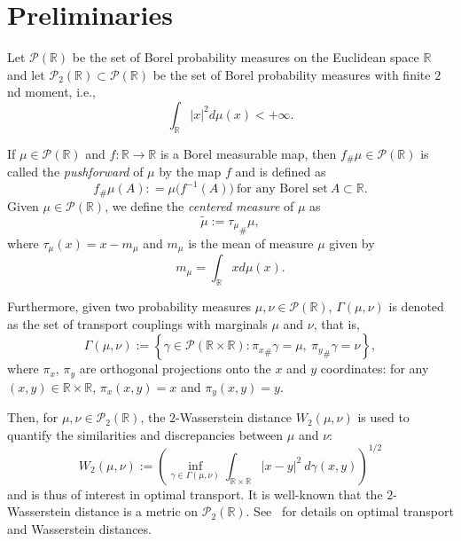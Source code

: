 \documentclass{amsart}
\numberwithin{equation}{section}
\theoremstyle{plain}
\theoremstyle{definition}
\begin{document}
\section{Preliminaries }\label{sec:preliminary}
Let $\mathcal{P}(\mathbb{R})$ be the set of Borel probability measures on the Euclidean space $\mathbb{R}$ and let $\mathcal{P}_2(\mathbb{R}) \subset \mathcal{P}(\mathbb{R})$  be the set of Borel probability measures with finite $2$nd moment, i.e., 
\begin{equation*}
   \int_{\mathbb{R}} \vert x \vert ^2 d\mu(x) < + \infty.
\end{equation*}

If $\mu \in  \mathcal{P}(\mathbb{R}) $ and $f: \mathbb{R} \rightarrow \mathbb{R}$ is a Borel measurable map, then $f_{\#} \mu \in \mathcal{P}(\mathbb{R})$ is called the \textit{pushforward} of $\mu$ by  the map $f$ and is defined as
$$f_{\#} \mu (A) : = \mu \big (f^{-1}(A) \big ) \ \text{for any Borel set}  \ A \subset \mathbb{R}.$$ 
Given $\mu \in  \mathcal{P}(\mathbb{R})$, we define the  \emph{centered measure} of $\mu$ as
\begin{equation*}
   \widetilde{\mu} := {\tau_\mu}_\# \mu,
\end{equation*}
where $\tau_\mu(x) = x -m_\mu$ and $m_\mu$ is the mean of measure $\mu$ given by
$$m_\mu = \int_{\mathbb{R}} x d\mu(x).$$


Furthermore, given two probability measures $\mu, \nu \in \mathcal{P}(\mathbb{R})$, $\Gamma(\mu,\nu)$ is denoted as the set of transport couplings with marginals $\mu$ and $\nu$, that is,
$$ \Gamma(\mu,\nu) :=  \left \{ \gamma \in \mathcal{P}(\mathbb{R} \times \mathbb{R}): {\pi_{{ x}}}_{\#} \gamma = \mu, \ {\pi_{{ y}}}_{\#} \gamma = \nu \right \},$$
where $\pi_{{ x}}$, $\pi_{{ y}}$ are orthogonal projections onto the $x$ and $y$ coordinates: for any $(x,y) \in \mathbb{R} \times \mathbb{R} $, $\pi_{{ x}}(x, y) = x$ and $ \pi_{{ y}}(x,y) = y$. 

Then, for $\mu,  \nu \in \mathcal{P}_2(\mathbb{R})$, the $2$-Wasserstein distance $ W_2(\mu,\nu)$ is used to quantify the similarities and discrepancies between $\mu$ and $\nu$:  
$$ W_2(\mu,\nu) := \left(\underset{\gamma \in \Gamma(\mu,\nu)}{\operatorname{inf}}  \int_{\mathbb{R} \times \mathbb{R}}  \left \vert x-y\right \vert^2 \ d\gamma(x,y)\right)^{1/2}$$
and is thus of interest in optimal transport.
It is well-known that the $2$-Wasserstein distance is a metric on $\mathcal{P}_2(\mathbb{R})$. 
See~\cite{figalli2021invitation} for details on optimal transport and Wasserstein distances.
\end{document}
